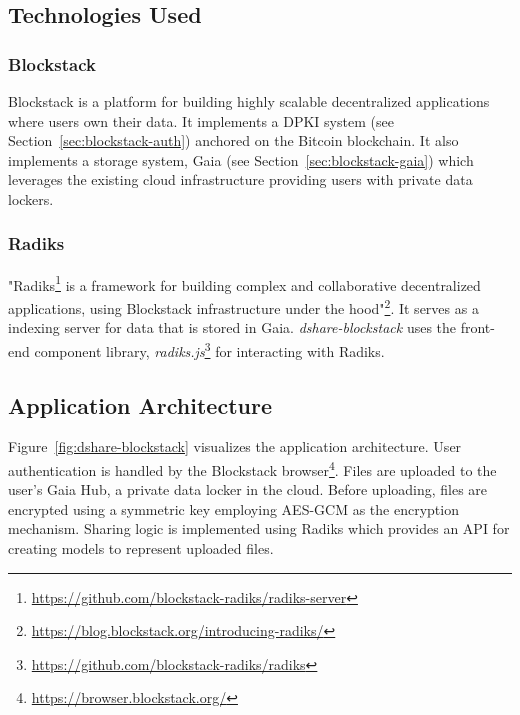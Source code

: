 		\subsection{Technologies Used}
			\subsubsection{Blockstack}
			Blockstack\cite{ali2016blockstack} is a platform for building highly scalable decentralized applications where users own their data. It implements a DPKI system (see Section~\ref{sec:blockstack-auth}) anchored on the Bitcoin blockchain. It also implements a storage system, Gaia (see Section~\ref{sec:blockstack-gaia}) which leverages the existing cloud infrastructure providing users with private data lockers.
			
			\subsubsection{Radiks}
			"Radiks\footnote{\url{https://github.com/blockstack-radiks/radiks-server}} is a framework for building complex and collaborative decentralized applications, using Blockstack infrastructure under the hood"\footnote{\url{https://blog.blockstack.org/introducing-radiks/}}. It serves as a indexing server for data that is stored in Gaia. \textit{dshare-blockstack} uses the front-end component library, \textit{radiks.js}\footnote{\url{https://github.com/blockstack-radiks/radiks}} for interacting with Radiks.
		
		\subsection{Application Architecture}
			Figure~\ref{fig:dshare-blockstack} visualizes the application architecture. User authentication is handled by the Blockstack browser\footnote{\url{https://browser.blockstack.org/}}. Files are uploaded to the user's Gaia Hub, a private data locker in the cloud. Before uploading, files are encrypted using a symmetric key employing AES-GCM as the encryption mechanism. Sharing logic is implemented using Radiks which provides an API for creating models to represent uploaded files.
		
